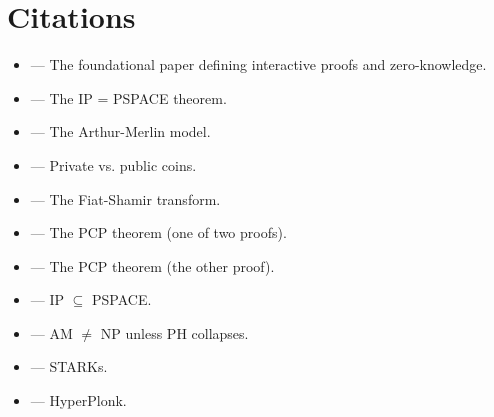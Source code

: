 \section{Citations}
\label{sec:ip:citations}

\begin{itemize}
\item \cite{GoldwasserMicaliRackoff1985} --- The foundational paper defining interactive proofs and zero-knowledge.
\item \cite{Shamir1992} --- The IP = PSPACE theorem.
\item \cite{Babai1985} --- The Arthur-Merlin model.
\item \cite{GoldwasserSipser1986} --- Private vs. public coins.
\item \cite{FiatShamir1986} --- The Fiat-Shamir transform.
\item \cite{AroraSafra1992} --- The PCP theorem (one of two proofs).
\item \cite{AroraEtAl1992} --- The PCP theorem (the other proof).
\item \cite{BabaiMoran1988} --- IP $\subseteq$ PSPACE.
\item \cite{Fortnow1990} --- AM $\neq$ NP unless PH collapses.
\item \cite{BenSassonEtAl2016} --- STARKs.
\item \cite{BenSassonEtAl2019} --- HyperPlonk.
\end{itemize}

